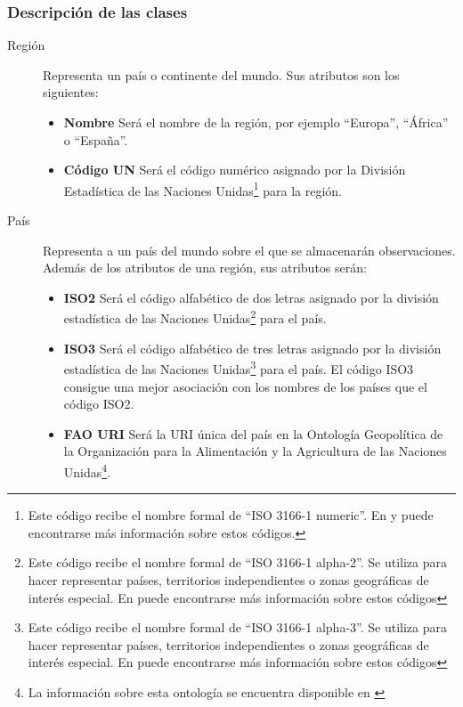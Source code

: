 \subsubsection{Descripción de las clases}
\begin{description}
\item[Región]	Representa un país o continente del mundo.  Sus atributos son los siguientes:
							\begin{itemize}
								\item \textbf{Nombre}  Será el nombre de la región, por ejemplo ``Europa'', ``África'' o ``España''.
								\item \textbf{Código UN}  Será el código numérico asignado por la División Estadística de las Naciones Unidas\footnote{Este código recibe el nombre formal de ``ISO 3166-1 numeric''.  En \cite{un:standard-country-codes} y \cite{un:iso-3166-country-codes} puede encontrarse más información sobre estos códigos.} para la región.
							\end{itemize}
\item[País]  Representa a un país del mundo sobre el que se almacenarán observaciones.  Además de los atributos de una región, sus atributos serán:
							\begin{itemize}
							\item \textbf{ISO2}  Será el código alfabético de dos letras asignado por la división estadística de las Naciones Unidas\footnote{Este código recibe el nombre formal de ``ISO 3166-1 alpha-2''. Se utiliza para hacer representar países, territorios independientes o zonas geográficas de interés especial. En \cite{un:iso-3166-country-codes} puede encontrarse más información sobre estos códigos} para el país.
							\item \textbf{ISO3}  Será el código alfabético de tres letras asignado por la división estadística de las Naciones Unidas\footnote{Este código recibe el nombre formal de ``ISO 3166-1 alpha-3''. Se utiliza para hacer representar países, territorios independientes o zonas geográficas de interés especial. En \cite{un:iso-3166-country-codes} puede encontrarse más información sobre estos códigos} para el país.  El código ISO3 consigue una mejor asociación con los nombres de los países que el código ISO2.
							\item \textbf{FAO URI}  Será la URI única del país en la Ontología Geopolítica de la Organización para la Alimentación y la Agricultura de las Naciones Unidas\footnote{La información sobre esta ontología se encuentra disponible en \cite{fao:geopolitical-ontology}}.

\end{itemize}
\end{description}
